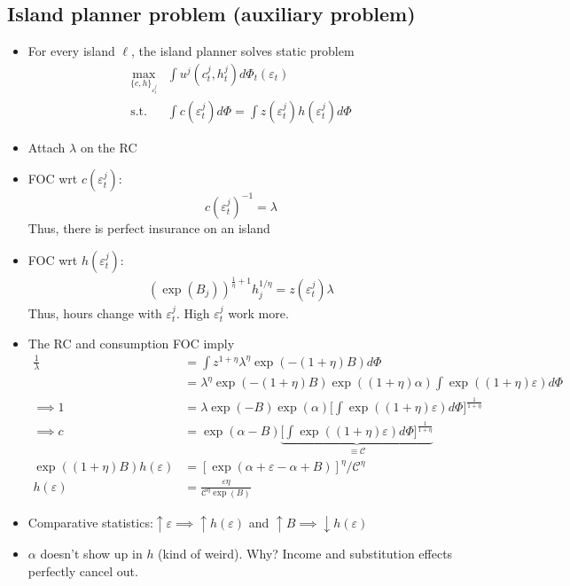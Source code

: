 \documentclass{article}
\begin{document}
\begin{enumerate}
\subsection*{Island planner problem (auxiliary problem)}

\begin{itemize}
\item For every island $\ell$, the island planner solves static problem
\begin{align*}
\max_{\{c, h\}_{\varepsilon^j_t}} & \int u^j(c_t^j, h_t^j) d \Phi_t (\varepsilon_t)\\
\text{s.t. } & \int c(\varepsilon_t^j) d \Phi = \int z(\varepsilon_t^j) h (\varepsilon_t^j) d \Phi 
\end{align*}
\item Attach $\lambda$ on the RC
\item FOC  wrt $c(\varepsilon_t^j)$:
$$
c(\varepsilon_t^j)^{-1} = \lambda 
$$
Thus, there is perfect insurance on an island
\item FOC wrt $h(\varepsilon_t^j)$:
\begin{align*}
(\exp(B_j))^{\frac{1}{\eta} + 1} h_j^{1/\eta} = z(\varepsilon_t^j) \lambda
\end{align*}
Thus, hours change with $\varepsilon_t^j$. High $\varepsilon_t^j$ work more.
\item The RC and consumption FOC imply
\begin{align*}
\frac{1}{\lambda} 
&= \int z^{1 + \eta} \lambda^\eta \exp(-(1+\eta)B) d \Phi\\
&= \lambda^\eta \exp(-(1+\eta) B) \exp((1+\eta)\alpha) \int \exp((1+\eta)\varepsilon) d \Phi\\
\implies
1 &= \lambda \exp(-B) \exp(\alpha) \Bigg[\int \exp((1 + \eta)\varepsilon)d\Phi \Bigg]^{\frac{1}{1+\eta}}\\
\implies
c &= \exp(\alpha - B) \underbrace{\Bigg[\int \exp((1 + \eta)\varepsilon)d\Phi \Bigg]^{\frac{1}{1+\eta}}}_{\equiv \mathcal{C}}\\
\exp((1+\eta)B)h(\varepsilon) &= [\exp(\alpha + \varepsilon - \alpha + B)]^\eta / \mathcal{C}^\eta\\
h(\varepsilon) &= \frac{\varepsilon \eta}{\mathcal{C}^\eta \exp(B)}
\end{align*}
\item Comparative statistics:$\uparrow \varepsilon \implies \uparrow h(\varepsilon)$ and $\uparrow B \implies \downarrow h(\varepsilon)$
\item $\alpha$ doesn't show up in $h$ (kind of weird). Why? Income and substitution effects perfectly cancel out.

\end{itemize}
\end{enumerate}
\end{document}
